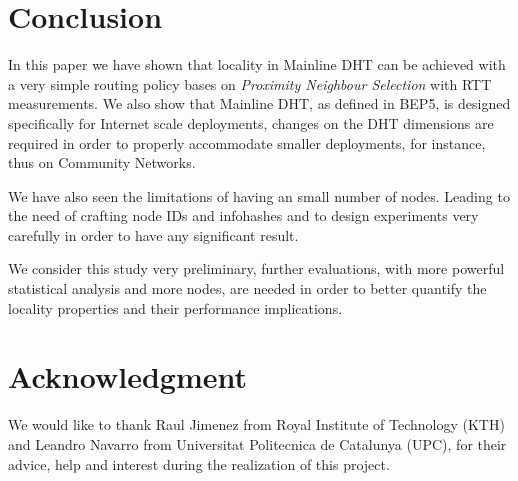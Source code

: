 \documentclass[conference]{IEEEtran}
\begin{document}
\section{Conclusion}
In this paper we have shown that locality in Mainline DHT can be achieved with a very simple routing policy bases on \textit{Proximity Neighbour Selection} with RTT measurements. We also show that Mainline DHT, as defined in BEP5, is designed specifically for Internet scale deployments, changes on the DHT dimensions are required in order to properly accommodate smaller deployments, for instance, thus on Community Networks.

We have also seen the limitations of having an small number of nodes. Leading to the need of crafting node IDs and infohashes and to design experiments very carefully in order to have any significant result.

We consider this study very preliminary, further evaluations, with more powerful statistical analysis and more nodes, are needed in order to better quantify the locality properties and their performance implications.

\section*{Acknowledgment}


We would like to thank Raul Jimenez from Royal Institute of Technology (KTH) and
Leandro Navarro from Universitat Politecnica de Catalunya (UPC), for their advice, help and interest during the realization of this project.


\ifCLASSOPTIONcaptionsoff
  \newpage
\fi




\end{document}
